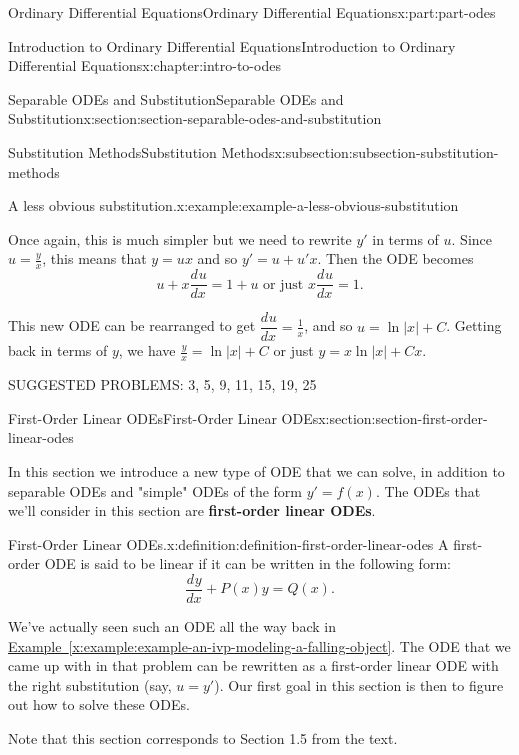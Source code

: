 \documentclass[oneside,10pt,]{book}
\newcommand{\xreffont}{\relax}
\newcommand{\terminology}[1]{\textbf{#1}}
\numberwithin{equation}{part}
\newcommand{\dv}[3][]{\dfrac{d^{#1} #2}{d #3^{#1}}}
\begin{document}
\begin{partptx}{Ordinary Differential Equations}{}{Ordinary Differential Equations}{}{}{x:part:part-odes}
\begin{chapterptx}{Introduction to Ordinary Differential Equations}{}{Introduction to Ordinary Differential Equations}{}{}{x:chapter:intro-to-odes}
\begin{sectionptx}{Separable ODEs and Substitution}{}{Separable ODEs and Substitution}{}{}{x:section:section-separable-odes-and-substitution}
\begin{subsectionptx}{Substitution Methods}{}{Substitution Methods}{}{}{x:subsection:subsection-substitution-methods}
\begin{example}{A less obvious substitution.}{x:example:example-a-less-obvious-substitution}
\par
Once again, this is much simpler but we need to rewrite \(y'\) in terms of \(u\). Since \(u=\frac{y}{x}\), this means that \(y=ux\) and so \(y' = u+u'x\). Then the ODE becomes%
\begin{equation*}
u+x\dv{u}{x} = 1+u\text{ or just } x\dv{u}{x} = 1\text{.}
\end{equation*}
%
\par
This new ODE can be rearranged to get \(\dv{u}{x} = \frac{1}{x}\), and so \(u = \ln|x|+C\). Getting back in terms of \(y\), we have \(\frac{y}{x} = \ln|x|+C\) or just \(y = x\ln|x|+Cx\).%
\end{example}
\end{subsectionptx}
\begin{conclusion}{}%
SUGGESTED PROBLEMS: 3, 5, 9, 11, 15, 19, 25%
\end{conclusion}%
\end{sectionptx}
%
%
\typeout{************************************************}
\typeout{************************************************}
%
\begin{sectionptx}{First-Order Linear ODEs}{}{First-Order Linear ODEs}{}{}{x:section:section-first-order-linear-odes}
\begin{introduction}{}%
In this section we introduce a new type of ODE that we can solve, in addition to separable ODEs and "simple" ODEs of the form \(y'=f(x)\). The ODEs that we'll consider in this section are \terminology{first-order linear ODEs}.%
\begin{definition}{First-Order Linear ODEs.}{x:definition:definition-first-order-linear-odes}%
%
A first-order ODE is said to be linear if it can be written in the following form:%
\begin{equation*}
\dv{y}{x} + P(x)y = Q(x).
\end{equation*}
%
\end{definition}
We've actually seen such an ODE all the way back in \hyperref[x:example:example-an-ivp-modeling-a-falling-object]{Example~{\xreffont\ref{x:example:example-an-ivp-modeling-a-falling-object}}}. The ODE that we came up with in that problem can be rewritten as a first-order linear ODE with the right substitution (say, \(u = y'\)). Our first goal in this section is then to figure out how to solve these ODEs.%
\par
Note that this section corresponds to Section 1.5 from the text.%
\end{introduction}%

\end{sectionptx}
\end{chapterptx}
\end{partptx}
\end{document}
